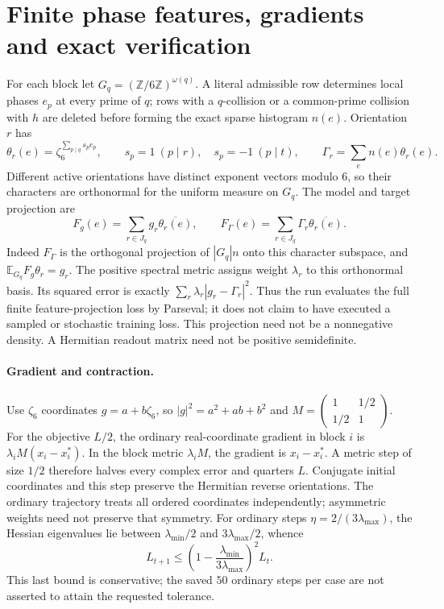 \section{Finite phase features, gradients and exact verification}\label{arl:details}
For each block let $G_q=(\mathbb Z/6\mathbb Z)^{\omega(q)}$.
A literal admissible row determines local phases $e_p$ at every prime of $q$;
rows with a $q$-collision or a common-prime collision with $h$ are deleted
before forming the exact sparse histogram $n(e)$. Orientation $r$ has
\[
 \theta_r(e)=\zeta_6^{\sum_{p\mid q}s_p e_p},\qquad
 s_p=1\ (p\mid r),\quad s_p=-1\ (p\mid t),\qquad
 \Gamma_r=\sum_e n(e)\theta_r(e).
\]
Different active orientations have distinct exponent vectors modulo $6$,
so their characters are orthonormal for the uniform measure on $G_q$.
The model and target projection are
\[
 F_g(e)=\sum_{r\in J_q}g_r\overline{\theta_r(e)},\qquad
 F_\Gamma(e)=\sum_{r\in J_q}\Gamma_r\overline{\theta_r(e)}.
\]
Indeed $F_\Gamma$ is the orthogonal projection of $|G_q|n$ onto this
character subspace, and $\mathbb E_{G_q}F_g\theta_r=g_r$.
The positive spectral metric assigns weight $\lambda_r$ to this orthonormal
basis. Its squared error is exactly $\sum_r\lambda_r|g_r-\Gamma_r|^2$.
Thus the run evaluates the full finite feature-projection loss by Parseval;
it does not claim to have executed a sampled or stochastic training loss.
This projection need not be a nonnegative density. A Hermitian readout matrix
need not be positive semidefinite.

\paragraph{Gradient and contraction.}
Use $\zeta_6$ coordinates $g=a+b\zeta_6$, so
$|g|^2=a^2+ab+b^2$ and
$M=\left(\begin{smallmatrix}1&1/2\\1/2&1\end{smallmatrix}\right)$.
For the objective $L/2$, the ordinary real-coordinate gradient in block $i$
is $\lambda_i M(x_i-x_i^*)$.
In the block metric $\lambda_iM$, the gradient is $x_i-x_i^*$.
A metric step of size $1/2$ therefore halves every complex error and quarters
$L$. Conjugate initial coordinates and this step preserve the Hermitian
reverse orientations. The ordinary trajectory treats all ordered coordinates
independently; asymmetric weights need not preserve that symmetry.
For ordinary steps $\eta=2/(3\lambda_{\max})$, the Hessian eigenvalues
lie between $\lambda_{\min}/2$ and $3\lambda_{\max}/2$, whence
\[
 L_{t+1}\le\left(1-\frac{\lambda_{\min}}{3\lambda_{\max}}\right)^2L_t.
\]
This last bound is conservative; the saved $50$ ordinary steps per case are
not asserted to attain the requested tolerance.

